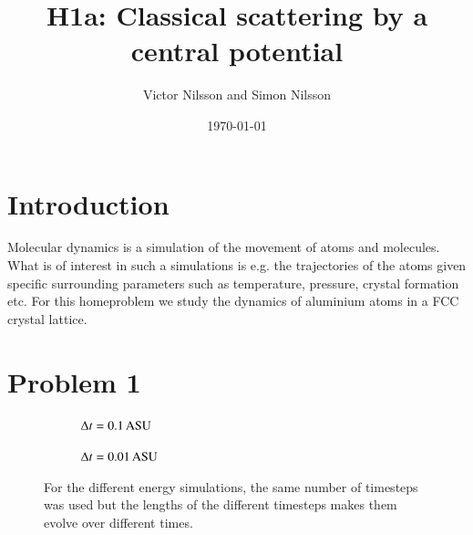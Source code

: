 



\title{H1a: Classical scattering by a central potential}
\author{Victor Nilsson and Simon Nilsson}
\date{\today}





\section*{Introduction}

Molecular dynamics is a simulation of the movement of atoms and molecules. What is of interest in such a simulations is e.g. the trajectories of the atoms given specific surrounding parameters such as temperature, pressure, crystal formation etc. For this homeproblem we study the dynamics of aluminium atoms in a FCC crystal lattice.

\section*{Problem 1}

\begin{figure}[H]
    \centering
    \captionsetup[subfigure]{justification=centering}
    \begin{subfigure}[b]{0.40\textwidth}
        \centering
        \resizebox{\columnwidth}{!}{}
        \caption{$\Delta t =\unit[0.1]{ASU}$}
        \label{fig:otherImg_a}
    \end{subfigure}
    \begin{subfigure}[b]{0.40\textwidth}
        \centering
        \resizebox{\columnwidth}{!}{}
        \caption{$\Delta t =\unit[0.01]{ASU}$}
        \label{fig:otherImg_b}
    \end{subfigure}
    \caption{For the different energy simulations, the same number of timesteps was used but the lengths of the different timesteps makes them evolve over different times.}
\end{figure}

